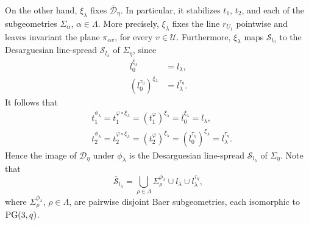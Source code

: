 \documentclass[11pt]{article}
\theoremstyle{definition}
\numberwithin{equation}{section}
\def\cD{\mathcal D}
\def\cU{\mathcal U}
\def\cS{\mathcal S}
\def\PG{{\rm PG}}
\def\F{{\mathbb F}}
\begin{document}
On the other hand, $\xi_{\lambda}$ fixes $\overline{\cD}_{\eta}$. In particular, it stabilizes $t_1$, $t_2$, and each of the subgeometries $\Sigma_{\alpha}$, $\alpha \in \Lambda$. More precisely, $\xi_{\lambda}$ fixes the line $r_{U_1}$ pointwise and leaves invariant the plane $\pi_{\alpha v}$, for every $v \in \cU$. Furthermore, $\xi_{\lambda}$ maps $\cS_{l_0}$ to the Desarguesian line-spread $\cS_{l_\lambda}$ of $\Sigma_{\eta}$, since 
\begin{align*}
 l_0^{\xi_{\lambda}} & = l_{\lambda}, \\
 \left(l_0^{\tau_{\eta}}\right)^{\xi_{\lambda}} & = l_\lambda^{\tau_{\eta}}. 
\end{align*}
It follows that 
\begin{align*}
 & t_1^{\phi_{\lambda}} = t_1^{\varphi \circ \xi_{\lambda}} = \left(t_1^\varphi\right)^{\xi_{\lambda}} = l_0^{\xi_{\lambda}} = l_\lambda, \\
& t_2^{\phi_{\lambda}}  = t_2^{\varphi \circ \xi_{\lambda}} = \left(t_2^\varphi\right)^{\xi_{\lambda}} = \left(l_0^{\tau_{\eta}}\right)^{\xi_{\lambda}} = l_\lambda^{\tau_{\eta}}. 
\end{align*}
Hence the image of $\cD_{\eta}$ under $\phi_{\lambda}$ is the Desarguesian line-spread $\cS_{l_{\lambda}}$ of $\Sigma_{\eta}$. Note that 
\begin{equation} \label{eq:imageSlambda}
\overline{\cS}_{l_{\lambda}} = \bigcup_{\rho \in \Lambda} \Sigma_{\rho}^{\phi_{\lambda}} \cup l_{\lambda} \cup l_{\lambda}^{\tau_{\eta}},
\end{equation}
where $\Sigma_{\rho}^{\phi_{\lambda}}$, $\rho \in \Lambda$, are pairwise disjoint Baer subgeometries, each isomorphic to $\PG(3, q)$. 
\end{document}
